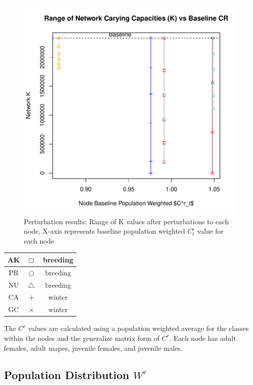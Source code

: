 \documentclass[10pt]{article}
\begin{document}
\vspace{-.5cm}
\begin{figure}[H]
\begin{center}
\includegraphics[width=.8\textwidth, height=.8\textwidth]{RGraphics-pintail_barcr_averageCR}
\caption{Perturbation results: Range of K values after perturbations to each node, X-axis represents baseline population weighted $C^r_t$ value for each node}\label{fig:pintail_barcr_averageCR}
\end{center}
\end{figure}

\vspace{-.5cm}
\begin{tabular}{|c|c|c|}
\hline
{\color{Sepia}AK} & $\Box$ & breeding \\
\hline
{\color{red}PR} & $\bigcirc$ & breeding \\
\hline
{\color{orange}NU} & $\triangle$ & breeding \\
\hline
{\color{blue}CA} & $+$ & winter \\
\hline
{\color{cyan}GC} & $\times$ & winter \\
\hline
\end{tabular}

\vspace{1cm}
The $C^r$ values are calculated using a population weighted average for the classes within the nodes and the generalize matrix form of $C^r$. Each node has adult females, adult mapes, juvenile females, and juvenile males.

\newpage
\subsection{Population Distribution \texorpdfstring{$W^r$}{WR}}
\end{document}
